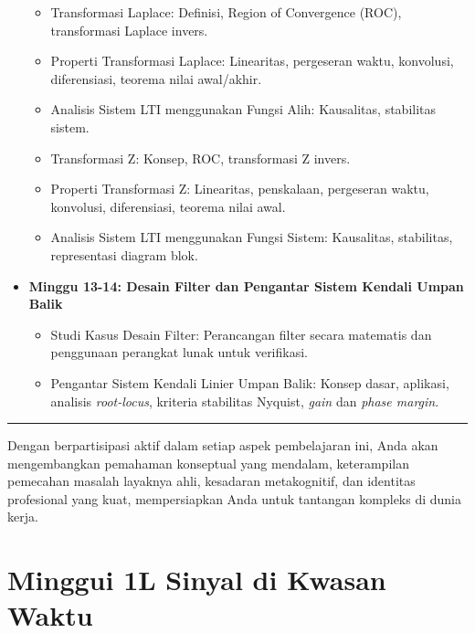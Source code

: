 \documentclass[
  letterpaper,
  DIV=11,
  numbers=noendperiod]{scrreprt}
\providecommand{\tightlist}{%
  \setlength{\itemsep}{0pt}\setlength{\parskip}{0pt}}
\begin{document}
\begin{itemize}
  \begin{itemize}
  \tightlist
  \item
    Transformasi Laplace: Definisi, Region of Convergence (ROC),
    transformasi Laplace invers.
  \item
    Properti Transformasi Laplace: Linearitas, pergeseran waktu,
    konvolusi, diferensiasi, teorema nilai awal/akhir.
  \item
    Analisis Sistem LTI menggunakan Fungsi Alih: Kausalitas, stabilitas
    sistem.
  \item
    Transformasi Z: Konsep, ROC, transformasi Z invers.
  \item
    Properti Transformasi Z: Linearitas, penskalaan, pergeseran waktu,
    konvolusi, diferensiasi, teorema nilai awal.
  \item
    Analisis Sistem LTI menggunakan Fungsi Sistem: Kausalitas,
    stabilitas, representasi diagram blok.
  \end{itemize}
\item
  \textbf{Minggu 13-14: Desain Filter dan Pengantar Sistem Kendali Umpan
  Balik}

  \begin{itemize}
  \tightlist
  \item
    Studi Kasus Desain Filter: Perancangan filter secara matematis dan
    penggunaan perangkat lunak untuk verifikasi.
  \item
    Pengantar Sistem Kendali Linier Umpan Balik: Konsep dasar, aplikasi,
    analisis \emph{root-locus}, kriteria stabilitas Nyquist, \emph{gain}
    dan \emph{phase margin}.
  \end{itemize}
\end{itemize}

\begin{center}\rule{0.5\linewidth}{0.5pt}\end{center}

Dengan berpartisipasi aktif dalam setiap aspek pembelajaran ini, Anda
akan mengembangkan pemahaman konseptual yang mendalam, keterampilan
pemecahan masalah layaknya ahli, kesadaran metakognitif, dan identitas
profesional yang kuat, mempersiapkan Anda untuk tantangan kompleks di
dunia kerja.


\chapter{Minggui 1L Sinyal di Kwasan
Waktu}\label{minggui-1l-sinyal-di-kwasan-waktu}
\end{document}
